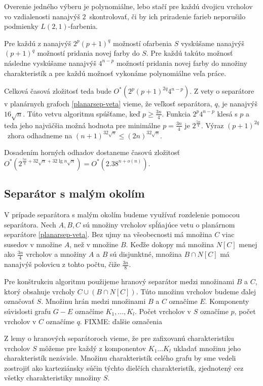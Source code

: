 Overenie
jedného výberu je polynomiálne, lebo stačí pre každú dvojicu vrcholov vo vzdialenosti nanajvýš
$2$ skontrolovať, či by ich priradenie farieb neporušilo podmienky $L(2,1)$-farbenia.

Pre každú z nanajvýš $2^p (p+1)^q$ možností ofarbenia $S$ vyskúšame nanajvýš $(p+1)^q$ možností pridania
novej farby do $S$. Pre každú takúto možnosť následne vyskúšame nanajvýš $4^{n-p}$ možností pridania novej
farby do množiny charakteristík a pre každú možnosť vykonáme polynomiálne veľa práce.

Celková časová
zložitosť teda bude $O^*(2^p (p+1)^{2q} 4^{n-p})$. Z vety o separátore v planárnych grafoch \ref{planarsep-veta}
vieme, že veľkosť separátora, $q$, je nanajvýš $16\sqrt{n}$. Túto vetvu algoritmu spúšťame, keď $p \ge \frac{3n}{4}$.
Funkcia $2^p 4^{n-p}$ klesá s $p$ a teda jeho najväčšia možná hodnota pre minimálne $p = \frac{3n}{4}$ je
$2^{\frac{5n}{4}}$. Výraz $(p+1)^{2q}$ zhora odhadneme na $(n+1)^{32\sqrt{n}} \leq (2n)^{32\sqrt{n}}$.

Dosadením horných odhadov dostaneme časovú zložitosť $O^*(2^{\frac{5n}{4} + 32\sqrt{n} + 32\lg{n}\sqrt{n}}) = O^*(2.38^{n + o(n)})$.

\subsection{Separátor s malým okolím}

V prípade separátora s malým okolím budeme využívať rozdelenie pomocou separátora. Nech $A, B, C$ sú množiny
vrcholov spĺňajúce vetu o planárnom separátore \ref{planarsep-veta}. Bez ujmy na všeobecnosti má množina $C$
viac susedov v množine $A$, než v množine $B$. Keďže dokopy má množina $N[C]$ menej ako $\frac{3n}{4}$ vrcholov
a množiny $A$ a $B$ sú disjunktné, množina $B \cap N[C]$ má nanajvýš polovicu z tohto počtu, čiže $\frac{3n}{8}$.

Pre konštrukciu algoritmu použijeme hranový separátor medzi množinami $B$ a $C$, ktorý obsahuje vrcholy
$C \cup (B \cap N[C])$. Túto množinu vrcholov budeme ďalej označovať $S$. Množinu hrán medzi množinami
$B$ a $C$ označíme $E$. Komponenty súvislosti grafu $G-E$ označíme $K_1, \ldots, K_l$. Počet vrcholov v $S$
označíme $p$, počet vrcholov v $C$ označíme $q$. FIXME: ďalšie označenia

Z lemy o hranových separátoroch vieme, že pre zafixovanú charakteristiku vrcholov $S$ môžeme pre každý
z komponentov $K_1 \ldots K_l$ ukladať množinu jeho charakteristík nezávisle. Množinu charakteristík
celého grafu by sme vedeli zostrojiť ako karteziánsky súčin týchto dielčích charakteristík, zjednotený cez
všetky charakteristiky množiny $S$.

